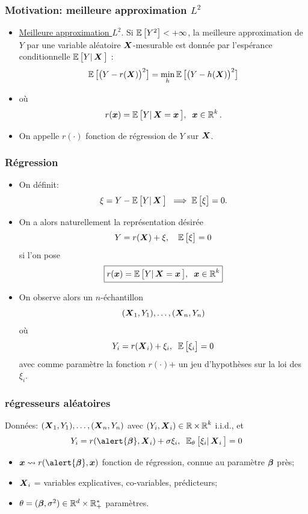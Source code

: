 \begin{frame}
\frametitle{Motivation: meilleure approximation $L^2$}
\begin{itemize}
\item \underline{Meilleure approximation $L^2$}. Si
$\E\big[Y^2\big]<+\infty$, la meilleure approximation de $Y$ par une
variable aléatoire $\bX$-mesurable est donnée par
\alert{l'espérance conditionnelle} $\E\big[Y|\bX\big]$ :
$$\E\big[\big(Y-r(\bX)\big)^2\big] = \min_h \E\big[\big(Y-h(\bX)\big)^2\big]$$
\item o\`u
$$r(\bx) = \E\big[Y|\bX=\bx\big],\;\;\bx \in \R^k.$$
\item On appelle $r(\cdot)$ \alert{fonction de régression de $Y$ sur
$\bX$}.
\end{itemize}
\end{frame}

\begin{frame}
\frametitle{Régression}
\begin{itemize}
\item On définit:
$$\xi = Y-\E\big[Y|\bX \big]\;\;\Longrightarrow\; \E\big[\xi\big]=0.$$
\item On a alors naturellement la représentation désirée
$$Y=r(\bX)+\xi, \quad \E\big[\xi\big]=0$$
si l'on pose
$$\boxed{r(\bx) = \E\big[Y|\bX=\bx\big],\;\;\bx \in \R^k}$$

\item On observe alors un $n$-échantillon
$$(\bX_1,Y_1),\ldots, (\bX_n,Y_n)$$
où
$$Y_i = r(\bX_i)+\xi_i,\;\;\E\big[\xi_i\big]=0$$
avec comme \alert{paramètre la fonction $r(\cdot)$}+ un \alert{jeu d'hypothèses} sur la loi des $\xi_i$.
\end{itemize}
\end{frame}

\begin{frame}
\frametitle{régresseurs aléatoires}
\begin{df}
Données: $(\bX_1,Y_1),\ldots, (\bX_n,Y_n)$ avec $(Y_i,\bX_i)\in \R\times \R^k$ \alert{i.i.d.},
et
$$Y_i = r(\alert{\truebeta},\bX_i)+ \sigma \xi_i,\;\;
\E_{\truetheta}\big[\xi_i|\bX_i\big]=0
$$
\begin{itemize}
\item \alert<1>{$\bx \leadsto r(\alert{\truebeta},\bx)$ fonction de \alert{ régression}, connue au paramètre
$\truebeta$ près;}
\item \alert<2>{$\bX_i$ = variables explicatives, co-variables, prédicteurs;}
\item \alert<3>{$\truetheta= (\truebeta,\sigma^2) \in \rset^d \times \rset_+^*$ paramètres.}
\end{itemize}
\end{df}
\end{frame}



